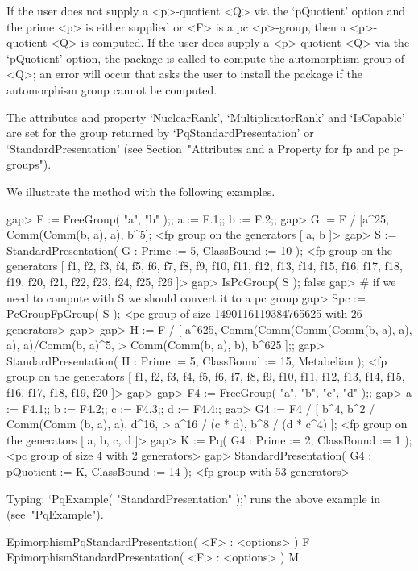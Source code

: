 If the user does not supply a <p>-quotient <Q> via the `pQuotient' option
and the prime <p> is either supplied or <F> is a  pc  <p>-group,  then  a
<p>-quotient <Q> is computed. If the user does supply a <p>-quotient  <Q>
via the `pQuotient' option, the package {\AutPGrp} is called  to  compute
the automorphism group of <Q>; an error will occur that asks the user  to
install the package  {\AutPGrp}  if  the  automorphism  group  cannot  be
computed.

The  attributes  and  property  `NuclearRank',  `MultiplicatorRank'   and
`IsCapable' are set for the group returned by `PqStandardPresentation' or
`StandardPresentation' (see Section~"Attributes and a Property for fp and
pc p-groups").

We illustrate the method with the following examples.

\beginexample
gap> F := FreeGroup( "a", "b" );; a := F.1;; b := F.2;;
gap> G := F / [a^25, Comm(Comm(b, a), a), b^5];
<fp group on the generators [ a, b ]>
gap> S := StandardPresentation( G : Prime := 5, ClassBound := 10 );
<fp group on the generators [ f1, f2, f3, f4, f5, f6, f7, f8, f9, f10, f11, 
  f12, f13, f14, f15, f16, f17, f18, f19, f20, f21, f22, f23, f24, f25, f26 ]>
gap> IsPcGroup( S );
false
gap> # if we need to compute with S we should convert it to a pc group
gap> Spc := PcGroupFpGroup( S );
<pc group of size 1490116119384765625 with 26 generators>
gap> 
gap> H := F / [ a^625, Comm(Comm(Comm(Comm(b, a), a), a), a)/Comm(b, a)^5,
>               Comm(Comm(b, a), b), b^625 ];;                     
gap> StandardPresentation( H : Prime := 5, ClassBound := 15, Metabelian );
<fp group on the generators [ f1, f2, f3, f4, f5, f6, f7, f8, f9, f10, f11, 
  f12, f13, f14, f15, f16, f17, f18, f19, f20 ]>
gap> 
gap> F4 := FreeGroup( "a", "b", "c", "d" );;                        
gap> a := F4.1;; b := F4.2;; c := F4.3;; d := F4.4;;
gap> G4 := F4 / [ b^4, b^2 / Comm(Comm (b, a), a), d^16,                
>                 a^16 / (c * d), b^8 / (d * c^4) ];
<fp group on the generators [ a, b, c, d ]>
gap> K := Pq( G4 : Prime := 2, ClassBound := 1 );
<pc group of size 4 with 2 generators>
gap> StandardPresentation( G4 : pQuotient := K, ClassBound := 14 );
<fp group with 53 generators>
\endexample

Typing: `PqExample( "StandardPresentation" );' runs the above example  in
{\GAP} (see~"PqExample").

\>EpimorphismPqStandardPresentation( <F> : <options> ) F
\>EpimorphismStandardPresentation( <F> : <options> ) M

